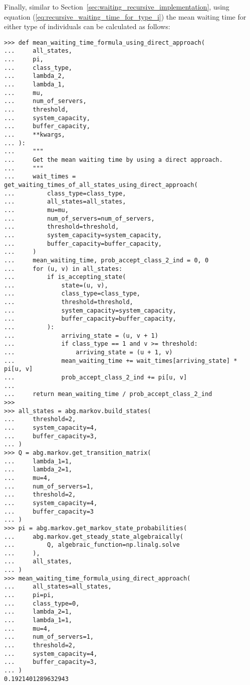 Finally, similar to Section~\ref{sec:waiting_recursive_implementation}, using
equation (\ref{eq:recursive_waiting_time_for_type_i}) the mean waiting time
for either type of individuals can be calculated as follows:

\begin{lstlisting}[style=pystyle] 
>>> def mean_waiting_time_formula_using_direct_approach(
...     all_states,
...     pi,
...     class_type,
...     lambda_2,
...     lambda_1,
...     mu,
...     num_of_servers,
...     threshold,
...     system_capacity,
...     buffer_capacity,
...     **kwargs,
... ):
...     """
...     Get the mean waiting time by using a direct approach.
...     """
...     wait_times = get_waiting_times_of_all_states_using_direct_approach(
...         class_type=class_type,
...         all_states=all_states,
...         mu=mu,
...         num_of_servers=num_of_servers,
...         threshold=threshold,
...         system_capacity=system_capacity,
...         buffer_capacity=buffer_capacity,
...     )
...     mean_waiting_time, prob_accept_class_2_ind = 0, 0
...     for (u, v) in all_states:
...         if is_accepting_state(
...             state=(u, v),
...             class_type=class_type,
...             threshold=threshold,
...             system_capacity=system_capacity,
...             buffer_capacity=buffer_capacity,
...         ):
...             arriving_state = (u, v + 1)
...             if class_type == 1 and v >= threshold:
...                 arriving_state = (u + 1, v)
...             mean_waiting_time += wait_times[arriving_state] * pi[u, v]
...             prob_accept_class_2_ind += pi[u, v]
... 
...     return mean_waiting_time / prob_accept_class_2_ind
>>>
>>> all_states = abg.markov.build_states(
...     threshold=2,
...     system_capacity=4,
...     buffer_capacity=3,
... )
>>> Q = abg.markov.get_transition_matrix(
...     lambda_1=1,
...     lambda_2=1,
...     mu=4,
...     num_of_servers=1,
...     threshold=2,
...     system_capacity=4,
...     buffer_capacity=3
... )
>>> pi = abg.markov.get_markov_state_probabilities(
...     abg.markov.get_steady_state_algebraically(
...         Q, algebraic_function=np.linalg.solve
...     ),
...     all_states,
... )
>>> mean_waiting_time_formula_using_direct_approach(
...     all_states=all_states,
...     pi=pi,
...     class_type=0,
...     lambda_2=1,
...     lambda_1=1,
...     mu=4,
...     num_of_servers=1,
...     threshold=2,
...     system_capacity=4,
...     buffer_capacity=3,
... )
0.1921401289632943

\end{lstlisting}


